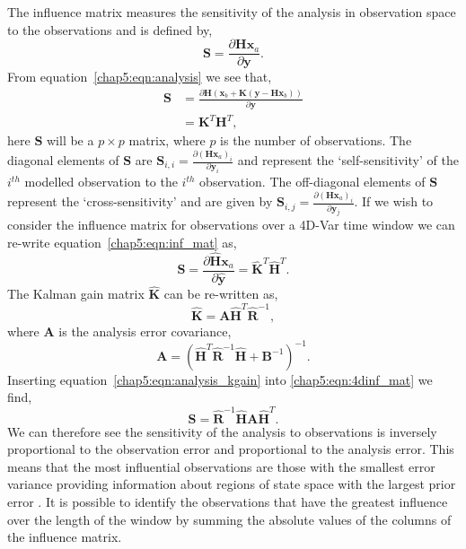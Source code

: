 The influence matrix measures the sensitivity of the analysis in observation space to the observations \citep{Cardinali2004} and is defined by,
\begin{equation}
\textbf{S} = \frac{\partial \textbf{H}\textbf{x}_{a}}{\partial \textbf{y}}. \label{chap5:eqn:inf_mat}
\end{equation}
From equation~\eqref{chap5:eqn:analysis} we see that,
\begin{equation}
\begin{split}
\textbf{S} &= \frac{\partial \textbf{H}(\textbf{x}_{b} + \textbf{K}(\textbf{y} - \textbf{H}\textbf{x}_{b}))}{\partial \textbf{y}} \\
	       &= \textbf{K}^{T}\textbf{H}^{T},
\end{split}
\end{equation}
here $\textbf{S}$ will be a $p \times p$ matrix, where $p$ is the number of observations. The diagonal elements of $\textbf{S}$ are $\textbf{S}_{i,i} = \frac{\partial (\textbf{H}\textbf{x}_{a})_{i}}{\partial \textbf{y}_{i}}$ and represent the `self-sensitivity' of the $i^{th}$ modelled observation to the $i^{th}$ observation. The off-diagonal elements of $\textbf{S}$ represent the `cross-sensitivity' and are given by $\textbf{S}_{i,j} = \frac{\partial (\textbf{H}\textbf{x}_{a})_{i}}{\partial \textbf{y}_{j}}$. If we wish to consider the influence matrix for observations over a 4D-Var time window we can re-write equation~\eqref{chap5:eqn:inf_mat} as,
\begin{equation}
\textbf{S} = \frac{\partial \hat{\textbf{H}}\textbf{x}_{a}}{\partial \hat{\textbf{y}}} = \hat{\textbf{K}}^{T}\hat{\textbf{H}}^{T}. \label{chap5:eqn:4dinf_mat}
\end{equation}
The Kalman gain matrix $\hat{\textbf{K}}$ can be re-written as,
\begin{equation}
\hat{\textbf{K}} = \textbf{A}\hat{\textbf{H}}^{T}\hat{\textbf{R}}^{-1}, \label{chap5:eqn:analysis_kgain}
\end{equation}
where $\textbf{A}$ is the analysis error covariance,
\begin{equation}
\textbf{A} = (\hat{\textbf{H}}^{T}\hat{\textbf{R}}^{-1}\hat{\textbf{H}} + \textbf{B}^{-1})^{-1}.
\end{equation}
Inserting equation~\eqref{chap5:eqn:analysis_kgain} into \eqref{chap5:eqn:4dinf_mat} we find,
 \begin{equation}
 \textbf{S} = \hat{\textbf{R}}^{-1}\hat{\textbf{H}}\textbf{A}\hat{\textbf{H}}^{T}.
 \end{equation}
We can therefore see the sensitivity of the analysis to observations is inversely proportional to the observation error and proportional to the analysis error. This means that the most influential observations are those with the smallest error variance providing information about regions of state space with the largest prior error \citep{Cardinali2004}. It is possible to identify the observations that have the greatest influence over the length of the window by summing the absolute values of the columns of the influence matrix.

